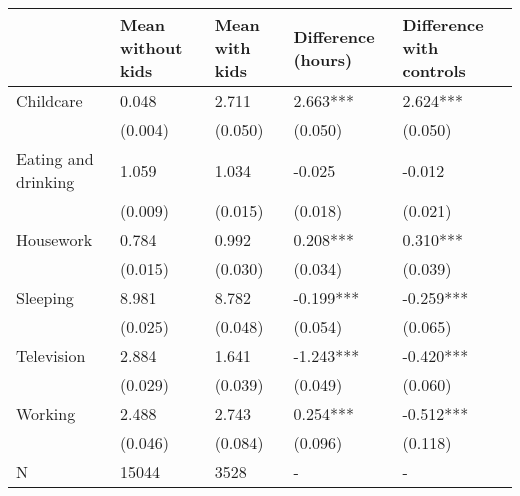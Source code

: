\begin{tabular}{lllll}
\toprule
{} & Mean without kids & Mean with kids & Difference (hours) & Difference with controls \\
\midrule
Childcare           &             0.048 &          2.711 &           2.663*** &                 2.624*** \\
                    &           (0.004) &        (0.050) &            (0.050) &                  (0.050) \\
Eating and drinking &             1.059 &          1.034 &             -0.025 &                   -0.012 \\
                    &           (0.009) &        (0.015) &            (0.018) &                  (0.021) \\
Housework           &             0.784 &          0.992 &           0.208*** &                 0.310*** \\
                    &           (0.015) &        (0.030) &            (0.034) &                  (0.039) \\
Sleeping            &             8.981 &          8.782 &          -0.199*** &                -0.259*** \\
                    &           (0.025) &        (0.048) &            (0.054) &                  (0.065) \\
Television          &             2.884 &          1.641 &          -1.243*** &                -0.420*** \\
                    &           (0.029) &        (0.039) &            (0.049) &                  (0.060) \\
Working             &             2.488 &          2.743 &           0.254*** &                -0.512*** \\
                    &           (0.046) &        (0.084) &            (0.096) &                  (0.118) \\
N                   &             15044 &           3528 &                  - &                        - \\
\bottomrule
\end{tabular}
